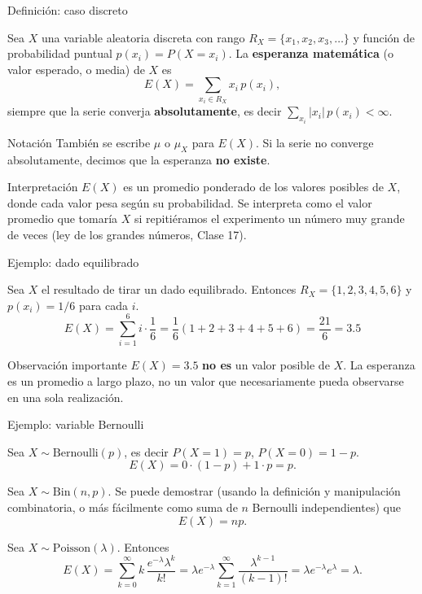 \documentclass[aspectratio=169,11pt]{beamer}
\begin{document}
\begin{frame}{Definición: caso discreto}
\begin{definition}
Sea $X$ una variable aleatoria discreta con rango $R_X = \{x_1, x_2, x_3, \dots\}$ y función de probabilidad puntual $p(x_i) = P(X = x_i)$. La \textbf{esperanza matemática} (o valor esperado, o media) de $X$ es
\[
E(X) = \sum_{x_i \in R_X} x_i \, p(x_i),
\]
siempre que la serie converja \textbf{absolutamente}, es decir $\sum_{x_i} |x_i| \, p(x_i) < \infty$.
\end{definition}

\begin{block}{Notación}
También se escribe $\mu$ o $\mu_X$ para $E(X)$. Si la serie no converge absolutamente, decimos que la esperanza \textbf{no existe}.
\end{block}

\begin{alertblock}{Interpretación}
$E(X)$ es un promedio ponderado de los valores posibles de $X$, donde cada valor pesa según su probabilidad. Se interpreta como el valor promedio que tomaría $X$ si repitiéramos el experimento un número muy grande de veces (ley de los grandes números, Clase 17).
\end{alertblock}
\end{frame}

\begin{frame}{Ejemplo: dado equilibrado}
\begin{example}
Sea $X$ el resultado de tirar un dado equilibrado. Entonces $R_X = \{1,2,3,4,5,6\}$ y $p(x_i) = 1/6$ para cada $i$.
\[
E(X) = \sum_{i=1}^{6} i \cdot \frac{1}{6} = \frac{1}{6}(1+2+3+4+5+6) = \frac{21}{6} = 3.5
\]
\end{example}

\begin{block}{Observación importante}
$E(X) = 3.5$ \textbf{no es} un valor posible de $X$. La esperanza es un promedio a largo plazo, no un valor que necesariamente pueda observarse en una sola realización.
\end{block}
\end{frame}

\begin{frame}{Ejemplo: variable Bernoulli}
\begin{example}
Sea $X \sim \text{Bernoulli}(p)$, es decir $P(X=1) = p$, $P(X=0) = 1-p$.
\[
E(X) = 0 \cdot (1-p) + 1 \cdot p = p.
\]
\end{example}

\begin{example}[Binomial]
Sea $X \sim \text{Bin}(n,p)$. Se puede demostrar (usando la definición y manipulación combinatoria, o más fácilmente como suma de $n$ Bernoulli independientes) que
\[
E(X) = np.
\]
\end{example}

\begin{example}[Poisson]
Sea $X \sim \text{Poisson}(\lambda)$. Entonces
\[
E(X) = \sum_{k=0}^{\infty} k \, \frac{e^{-\lambda}\lambda^k}{k!} = \lambda e^{-\lambda}\sum_{k=1}^{\infty} \frac{\lambda^{k-1}}{(k-1)!} = \lambda e^{-\lambda} e^{\lambda} = \lambda.
\]
\end{example}
\end{frame}
\end{document}
